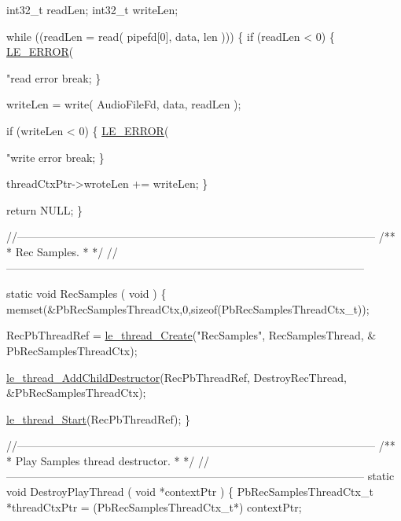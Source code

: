 \begin{DoxyCodeInclude}
{{{{{    int32\_t readLen;
    int32\_t writeLen;

    \textcolor{keywordflow}{while} ((readLen = read( pipefd[0], data, len )))
    \{
        \textcolor{keywordflow}{if} (readLen < 0)
        \{
            \hyperlink{le__log_8h_a353590f91b3143a7ba3a416ae5a50c3d}{LE\_ERROR}(\textcolor{stringliteral}{"read error %
            \textcolor{keywordflow}{break};
        \}

        writeLen = write( AudioFileFd, data, readLen );

        \textcolor{keywordflow}{if} (writeLen < 0)
        \{
            \hyperlink{le__log_8h_a353590f91b3143a7ba3a416ae5a50c3d}{LE\_ERROR}(\textcolor{stringliteral}{"write error %
            \textcolor{keywordflow}{break};
        \}

        threadCtxPtr->wroteLen += writeLen;
    \}

    \textcolor{keywordflow}{return} NULL;
\}

\textcolor{comment}{//--------------------------------------------------------------------------------------------------}\textcolor{comment}{}
\textcolor{comment}{/**}
\textcolor{comment}{ * Rec Samples.}
\textcolor{comment}{ *}
\textcolor{comment}{ */}
\textcolor{comment}{//--------------------------------------------------------------------------------------------------}

\textcolor{keyword}{static} \textcolor{keywordtype}{void} RecSamples
(
    \textcolor{keywordtype}{void}
)
\{
    memset(&PbRecSamplesThreadCtx,0,\textcolor{keyword}{sizeof}(PbRecSamplesThreadCtx\_t));

    RecPbThreadRef = \hyperlink{le__thread_8h_a87e02a46f92e9e3e11ed28a2b265872f}{le\_thread\_Create}(\textcolor{stringliteral}{"RecSamples"}, RecSamplesThread, &
      PbRecSamplesThreadCtx);

    \hyperlink{le__thread_8h_a671dbe2927a3b2a13c5150476398f34f}{le\_thread\_AddChildDestructor}(RecPbThreadRef,
                                DestroyRecThread,
                                &PbRecSamplesThreadCtx);

    \hyperlink{le__thread_8h_a38df3877ee5ab9fac17b2fc0be46c27e}{le\_thread\_Start}(RecPbThreadRef);
\}

\textcolor{comment}{//--------------------------------------------------------------------------------------------------}\textcolor{comment}{}
\textcolor{comment}{/**}
\textcolor{comment}{ *  Play Samples thread destructor.}
\textcolor{comment}{ *}
\textcolor{comment}{ */}
\textcolor{comment}{//--------------------------------------------------------------------------------------------------}
\textcolor{keyword}{static} \textcolor{keywordtype}{void} DestroyPlayThread
(
    \textcolor{keywordtype}{void} *contextPtr
)
\{
    PbRecSamplesThreadCtx\_t *threadCtxPtr = (PbRecSamplesThreadCtx\_t*) contextPtr;

}}}}}}}
\end{DoxyCodeInclude}
